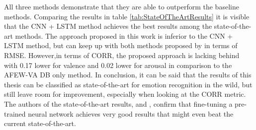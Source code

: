 All three methods demonstrate that they are able to outperform the baseline methods. Comparing the results in table \ref{tab:StateOfTheArtResults} it is visible that the CNN + LSTM method achieves the best results among the state-of-the-art methods.
\newline\newline
The approach proposed in this work is inferior to the CNN + LSTM method, but can keep up with both methods proposed by \citet{Handrich:2020:SimultaneousPredVA} in terms of RMSE. However,in terms of CORR, the proposed approach is lacking behind with 0.17 lower for valence and 0.02 lower for arousal in comparison to the AFEW-VA DB only method.
\newline\newline
In conclusion, it can be said that the results of this thesis can be classified as state-of-the-art for emotion recognition in the wild, but still leave room for improvement, especially when looking at the CORR metric. The authors of the state-of-the-art results, \citet{Theagarajan:2018:DeepDriver} and \citet{Handrich:2020:SimultaneousPredVA}, confirm that fine-tuning a pre-trained neural network achieves very good results that might even beat the current state-of-the-art.

